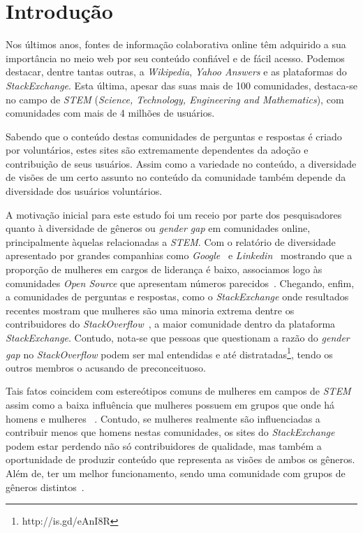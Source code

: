 \chapter{Introdução}
\label{sec:introduction}

Nos últimos anos, fontes de informação colaborativa online têm adquirido a sua importância no meio web por seu conteúdo confiável e de fácil acesso. Podemos destacar, dentre tantas outras, a \emph{Wikipedia}, \emph{Yahoo Answers} e as plataformas do \emph{StackExchange}. Esta última, apesar das suas mais de 100 comunidades, destaca-se no campo de \emph{STEM} (\emph{Science, Technology, Engineering and Mathematics}), com comunidades com mais de 4 milhões de usuários. 

Sabendo que o conteúdo destas comunidades de perguntas e respostas é criado por voluntários, estes sites são extremamente dependentes da adoção e contribuição de seus usuários. Assim como a variedade no conteúdo, a diversidade de visões de um certo assunto no conteúdo da comunidade também depende da diversidade dos usuários voluntários.

A motivação inicial para este estudo foi um receio por parte dos pesquisadores quanto à diversidade de gêneros ou \emph{gender gap} em comunidades online, principalmente àquelas relacionadas a \emph{STEM}. Com o relatório de diversidade apresentado por grandes companhias como \emph{Google}~\cite{google:report} e \emph{Linkedin}~\cite{linkedin:report} mostrando que a proporção de mulheres em cargos de liderança é baixo, associamos logo às comunidades \emph{Open Source} que apresentam números parecidos~\cite{rustad2011suck}. Chegando, enfim, a comunidades de perguntas e respostas, como o \emph{StackExchange} onde resultados recentes mostram que mulheres são uma minoria extrema dentre os contribuidores do \emph{StackOverflow}~\cite{Vasilescu27092013}, a maior comunidade dentro da plataforma \emph{StackExchange}. Contudo, nota-se que pessoas que questionam a razão do \emph{gender gap} no \emph{StackOverflow} podem ser mal entendidas e até distratadas\footnote{http://is.gd/eAnI8R}, tendo os outros membros o acusando de preconceituoso.

Tais fatos coincidem com estereótipos comuns de mulheres em campos de \emph{STEM}~\cite{spencer1999stereotype} assim como a baixa influência que mulheres possuem em grupos que onde há homens e mulheres ~\cite{karpowitz2012gender}. Contudo, se mulheres realmente são influenciadas a contribuir menos que homens nestas comunidades, os sites do \emph{StackExchange} podem estar perdendo não só contribuidores de qualidade, mas também a oportunidade de produzir conteúdo que representa as visões de ambos os gêneros. Além de, ter um melhor funcionamento, sendo uma comunidade com grupos de gêneros distintos~\cite{marshall1975boys}.

